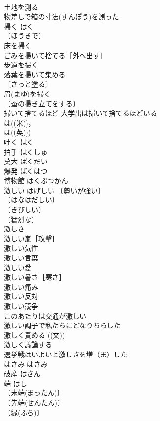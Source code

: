 \documentclass[8pt]{extreport}
\begin{document}
\begin{CJK}{UTF8}{min}
\\	土地を測る 
\\	物差しで箱の寸法(すんぽう)を測った 
\\	掃く	はく	
\\	〔ほうきで〕
\\	床を掃く 
\\	ごみを掃いて捨てる［外へ出す］ 
\\	歩道を掃く 
\\	落葉を掃いて集める 
\\	〔さっと塗る〕
\\	眉(まゆ)を掃く 
\\	〔蚕の掃き立てをする〕
\\	掃いて捨てるほど 大学出は掃いて捨てるほどいる 
\\	は((米))，
\\	は((英)))
\\	吐く	はく	
\\	拍手	はくしゅ	
\\	莫大	ばくだい	
\\	爆発	ばくはつ	
\\	博物館	はくぶつかん	
\\	激しい	はげしい	〔勢いが強い〕
\\	〔はなはだしい〕
\\	〔きびしい〕
\\	〔猛烈な〕
\\	激しさ 
\\	激しい嵐［攻撃］ 
\\	激しい気性 
\\	激しい言葉 
\\	激しい愛 
\\	激しい暑さ［寒さ］ 
\\	激しい痛み 
\\	激しい反対 
\\	激しい競争 
\\	このあたりは交通が激しい 
\\	激しい調子で私たちにどなりちらした 
\\	激しく責める ((文)) 
\\	激しく議論する 
\\	選挙戦はいよいよ激しさを増（ま）した 
\\	はさみ	はさみ	
\\	破産	はさん	
\\	端	はし	
\\	〔末端(まったん)〕
\\	〔先端(せんたん)〕
\\	〔縁(ふち)〕

\end{CJK}
\end{document}
